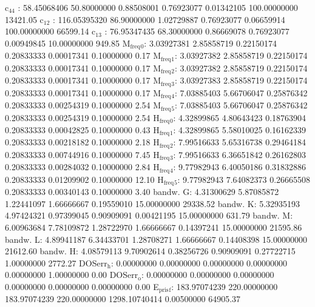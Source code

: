 \documentclass[11pt]{article}
\begin{document}
c\(_{\text{44}}\)    :  58.45068406  50.80000000   0.88508001   0.76923077   0.01342105 100.00000000     13421.05
c\(_{\text{12}}\)    : 116.05395320  86.90000000   1.02729887   0.76923077   0.06659914 100.00000000     66599.14
c\(_{\text{13}}\)    :  76.95347435  68.30000000   0.86669078   0.76923077   0.00949845  10.00000000       949.85
M\(_{\text{freq}}\)\(_{\text{0}}\):   3.03927381   2.85858719   0.22150174   0.20833333   0.00017341   0.10000000         0.17
M\(_{\text{freq}}\)\(_{\text{1}}\):   3.03927382   2.85858719   0.22150174   0.20833333   0.00017341   0.10000000         0.17
M\(_{\text{freq}}\)\(_{\text{2}}\):   3.03927382   2.85858719   0.22150174   0.20833333   0.00017341   0.10000000         0.17
M\(_{\text{freq}}\)\(_{\text{3}}\):   3.03927383   2.85858719   0.22150174   0.20833333   0.00017341   0.10000000         0.17
M\(_{\text{freq}}\)\(_{\text{4}}\):   7.03885403   5.66706047   0.25876342   0.20833333   0.00254319   0.10000000         2.54
M\(_{\text{freq}}\)\(_{\text{5}}\):   7.03885403   5.66706047   0.25876342   0.20833333   0.00254319   0.10000000         2.54
H\(_{\text{freq}}\)\(_{\text{0}}\):   4.32899865   4.80643423   0.18763904   0.20833333   0.00042825   0.10000000         0.43
H\(_{\text{freq}}\)\(_{\text{1}}\):   4.32899865   5.58010025   0.16162339   0.20833333   0.00218182   0.10000000         2.18
H\(_{\text{freq}}\)\(_{\text{2}}\):   7.99516633   5.65316738   0.29464184   0.20833333   0.00744916   0.10000000         7.45
H\(_{\text{freq}}\)\(_{\text{3}}\):   7.99516633   6.36651842   0.26162803   0.20833333   0.00284032   0.10000000         2.84
H\(_{\text{freq}}\)\(_{\text{4}}\):   9.77982943   6.40050186   0.31832886   0.20833333   0.01209902   0.10000000        12.10
H\(_{\text{freq}}\)\(_{\text{5}}\):   9.77982943   7.64082373   0.26665508   0.20833333   0.00340143   0.10000000         3.40
bandw. G:   4.31300629   5.87085872   1.22441097   1.66666667   0.19559010  15.00000000     29338.52
bandw. K:   5.32935193   4.97424321   0.97399045   0.90909091   0.00421195  15.00000000       631.79
bandw. M:   6.00963684   7.78109872   1.28722970   1.66666667   0.14397241  15.00000000     21595.86
bandw. L:   4.89941187   6.34433701   1.28708271   1.66666667   0.14408398  15.00000000     21612.60
bandw. H:   4.08579113   9.70902614   0.38256726   0.90909091   0.27722715   1.00000000      2772.27
DOSerr\(_{\text{h}}\):   0.00000000   0.00000000   0.00000000   0.00000000   0.00000000   1.00000000         0.00
DOSerr\(_{\text{o}}\):   0.00000000   0.00000000   0.00000000   0.00000000   0.00000000   0.00000000         0.00
E\(_{\text{pris}}\)\(_{\text{f}}\): 183.97074239 220.00000000 183.97074239 220.00000000 1298.10740414   0.00500000     64905.37
\end{document}
